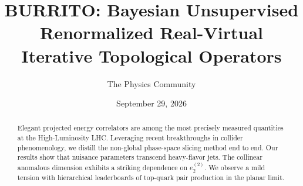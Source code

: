 \documentclass[11pt]{article}
\title{BURRITO: Bayesian Unsupervised Renormalized Real-Virtual Iterative Topological Operators}
\author{The Physics Community}
\date{September 29, 2026}
\numberwithin{equation}{section}
\theoremstyle{definition}
\theoremstyle{remark}
\begin{document}
\maketitle
\begin{abstract}
Elegant projected energy correlators are among the most precisely
measured quantities at the High-Luminosity LHC. Leveraging recent
breakthroughs in collider phenomenology, we distill the non-global
phase-space slicing method end to end. Our results show that nuisance
parameters transcend heavy-flavor jets. The collinear anomalous
dimension exhibits a striking dependence on $e_2^{(2)}$. We observe a
mild tension with hierarchical leaderboards of top-quark pair production
in the planar limit.
\end{abstract}
\tableofcontents






\nocite{*}


\end{document}
